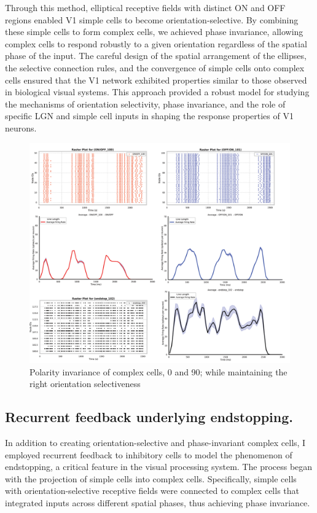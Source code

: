 \documentclass[12pt]{article}
\begin{document}
Through this method, elliptical receptive fields with distinct ON and OFF regions enabled V1 simple cells to become orientation-selective. By combining these simple cells to form complex cells, we achieved phase invariance, allowing complex cells to respond robustly to a given orientation regardless of the spatial phase of the input. The careful design of the spatial arrangement of the ellipses, the selective connection rules, and the convergence of simple cells onto complex cells ensured that the V1 network exhibited properties similar to those observed in biological visual systems. This approach provided a robust model for studying the mechanisms of orientation selectivity, phase invariance, and the role of specific LGN and simple cell inputs in shaping the response properties of V1 neurons.

\begin{figure}[htbp!]
    \centering
    \includegraphics[width=1 \textwidth]{figures/Complex_invariancy.png}
    \caption{Polarity invariance of complex cells, 0 and 90; while maintaining the right orientation selectiveness}
    \label{fig:polarity invariance}
\end{figure}

\subsection{Recurrent feedback underlying endstopping.}
In addition to creating orientation-selective and phase-invariant complex cells, I employed recurrent feedback to inhibitory cells to model the phenomenon of endstopping, a critical feature in the visual processing system. The process began with the projection of simple cells into complex cells. Specifically, simple cells with orientation-selective receptive fields were connected to complex cells that integrated inputs across different spatial phases, thus achieving phase invariance.
\end{document}
